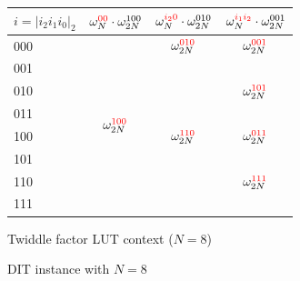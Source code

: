 \documentclass{iacrtrans}
\theoremstyle{plain}
\begin{document}
\begin{figure}[!tb]
\begin{subtable}[b]{0.8\textwidth}
  \centering
    \begin{tabular}{lccc}
     \hline
     $i=|i_2i_1i_0|_2$ & $\omega_N^{\textcolor{red}{00}}\cdot \omega_{2N}^{100}$ & $\omega_N^{\textcolor{red}{i_20}}\cdot \omega_{2N}^{010}$ & $\omega_N^{\textcolor{red}{i_1i_2}}\cdot \omega_{2N}^{001}$ \\
     \hline
     000 & \multirow{8}{*}{$\omega_{2N}^{\textcolor{red}{100}}$} & $\omega_{2N}^{\textcolor{red}{010}}$ & $\omega_{2N}^{\textcolor{red}{001}}$\\
     001 &                                      &                     &                     \\
     010 &                                      &                     & $\omega_{2N}^{\textcolor{red}{101}}$\\
     011 &                                      &                     &                     \\
     100 &                                      & $\omega_{2N}^{\textcolor{red}{110}}$ & $\omega_{2N}^{\textcolor{red}{011}}$\\
     101 &                                      &                     &                     \\
     110 &                                      &                     & $\omega_{2N}^{\textcolor{red}{111}}$\\
     111 &                                      &                     &                    \\
     \hline
     \end{tabular}
  \caption{Twiddle factor LUT context ($N=8$)}
  \label{table:table}
  \end{subtable}

\caption{DIT instance with $N=8$}
\end{figure}
\end{document}
